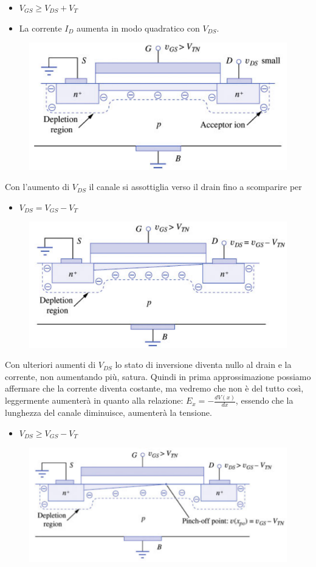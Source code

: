 \begin{itemize}
    \item $V_{GS} \geq V_{DS} + V_{T}$
    \item La corrente $I_D$ aumenta in modo quadratico con $V_{DS}$.
\end{itemize}

\begin{figure}[htbp]
    \centering
    \includegraphics[width=0.45\linewidth]{img/berkley1.png}     
\end{figure}

Con l'aumento di $V_{DS}$ il canale si assottiglia verso il drain fino a scomparire per 
\begin{itemize}
    \item $V_{DS} = V_{GS} - V_{T}$
\end{itemize}

\begin{figure}[htbp]
    \centering
    \includegraphics[width=0.45\linewidth]{img/berkley2.png}   
    
\end{figure}

Con ulteriori aumenti di $V_{DS}$ lo stato di inversione diventa nullo al drain e la corrente, non aumentando più, satura.
Quindi in prima approssimazione possiamo affermare che la corrente diventa costante, ma vedremo che non è del tutto così, leggermente aumenterà in quanto alla relazione: $E_x = -\frac{dV(x)}{dx}$, essendo che la lunghezza del canale diminuisce, aumenterà la tensione.

\begin{itemize}
    \item $V_{DS} \geq V_{GS} - V_{T}$
\end{itemize}

\begin{figure}[htbp]
    \centering
    \includegraphics[width=0.45\linewidth]{img/berkley3.png}    
    
\end{figure}

